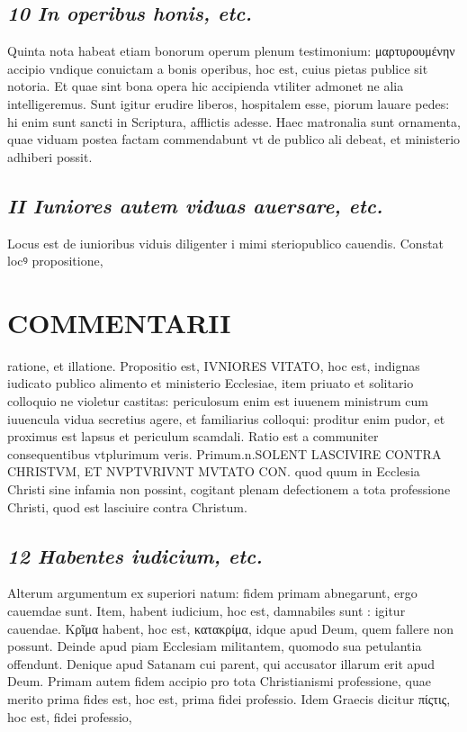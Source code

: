 \documentclass{article}
\begin{document}
\begin{pages}
\subsection*{\textit{10 In operibus honis, etc. }}\pstart Quinta nota habeat etiam bonorum operum plenum testimonium: μαρτυρουμένην accipio vndique conuictam a bonis operibus, hoc est, cuius pietas publice sit notoria. Et quae sint bona opera hic accipienda vtiliter admonet ne alia intelligeremus. Sunt igitur erudire liberos, hospitalem esse, piorum lauare pedes: hi enim sunt sancti in Scriptura, afflictis adesse. Haec matronalia sunt ornamenta, quae viduam postea factam commendabunt vt de publico ali debeat, et ministerio adhiberi possit.  \pend
{}
{}
\subsection*{\textit{II Iuniores autem viduas auersare, etc. }}\pstart Locus est de iunioribus  viduis diligenter i mimi steriopublico cauendis. Constat locꝰ propositione,  \pend
\section*{COMMENTARII }
\marginpar{[ p.128 ]}\pstart ratione, et illatione. Propositio est, IVNIORES VITATO, hoc est, indignas iudicato publico alimento et ministerio Ecclesiae, item priuato et solitario colloquio ne violetur castitas: periculosum enim est iuuenem ministrum cum iuuencula vidua secretius agere, et familiarius colloqui: proditur enim pudor, et proximus est lapsus et periculum scamdali. Ratio est a communiter consequentibus vtplurimum veris. Primum.n.SOLENT LASCIVIRE CONTRA CHRISTVM, ET NVPTVRIVNT MVTATO CON. quod quum in Ecclesia Christi sine infamia non possint, cogitant plenam defectionem a tota professione Christi, quod est lasciuire contra Christum.  \pend
{}
{}
\subsection*{\textit{12 Habentes iudicium, etc. }}\pstart Alterum argumentum ex superiori natum: fidem primam abnegarunt, ergo cauemdae sunt. Item, habent iudicium, hoc est, damnabiles sunt : igitur cauendae. Κρῖμα habent, hoc est, κατακρίμα, idque apud Deum, quem fallere non possunt. Deinde apud piam Ecclesiam militantem, quomodo sua petulantia offendunt. Denique apud Satanam cui parent, qui accusator illarum erit apud Deum.  \pend\pstart Primam autem fidem accipio pro tota Christianismi professione, quae merito prima fides est, hoc est, prima fidei professio. Idem Graecis dicitur πίςτις, hoc est, fidei professio,  \pend

\end{pages}
\end{document}

